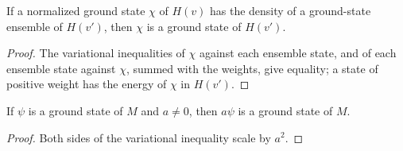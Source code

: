 \begin{lemma}
  \label{lem:weak_hk_ens}
  \leanok
  If a normalized ground state $\chi$ of $H(v)$ has the density of a ground-state ensemble of $H(v')$, then $\chi$ is a
  ground state of $H(v')$.
\end{lemma}
\begin{proof}
  \leanok
  The variational inequalities of $\chi$ against each ensemble state, and of each ensemble state against $\chi$, summed
  with the weights, give equality; a state of positive weight has the energy of $\chi$ in $H(v')$.
\end{proof}

\begin{lemma}
  \label{lem:isGroundState_smul}
  \leanok
  If $\psi$ is a ground state of $M$ and $a\neq0$, then $a\psi$ is a ground state of $M$.
\end{lemma}
\begin{proof}
  \leanok
  Both sides of the variational inequality scale by $a^2$.
\end{proof}

